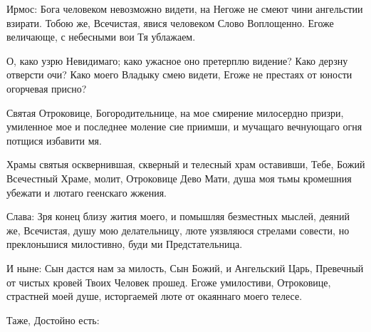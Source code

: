 \begin{mymulticols}


Ирмос: Бога человеком невозможно видети, на Негоже не смеют чини ангельстии взирати. Тобою же, Всечистая, явися человеком Слово Воплощенно. Егоже величающе, с небесными вои Тя ублажаем.





О, како узрю Невидимаго; како ужасное оно претерплю видение? Како дерзну отверсти очи? Како моего Владыку смею видети, Егоже не престаях от юности огорчевая присно?


Святая Отроковице, Богородительнице, на мое смирение милосердно призри, умиленное мое и последнее моление сие приимши, и мучащаго вечнующаго огня потщися избавити мя.


Храмы святыя осквернившая, скверный и телесный храм оставивши, Тебе, Божий Всечестный Храме, молит, Отроковице Дево Мати, душа моя тьмы кромешния убежати и лютаго геенскаго жжения.


Слава: Зря конец близу жития моего, и помышляя безместных мыслей, деяний же, Всечистая, душу мою делательницу, люте уязвляюся стрелами совести, но преклоньшися милостивно, буди ми Предстательница.


И ныне: Сын дастся нам за милость, Сын Божий, и Ангельский Царь, Превечный от чистых кровей Твоих Человек прошед. Егоже умилостиви, Отроковице, страстней моей душе, исторгаемей люте от окаяннаго моего телесе.


Таже, Достойно есть:

\end{mymulticols}

\mychapterending

